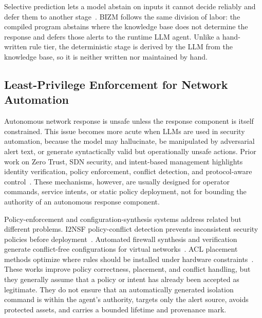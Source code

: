 \documentclass[final,5p]{elsarticle}
\begin{document}
Selective prediction lets a model abstain on inputs it cannot decide reliably and defer them to another stage~\cite{geifman2017selective}. BIZM follows the same division of labor: the compiled program abstains where the knowledge base does not determine the response and defers those alerts to the runtime LLM agent. Unlike a hand-written rule tier, the deterministic stage is derived by the LLM from the knowledge base, so it is neither written nor maintained by hand.

\subsection{Least-Privilege Enforcement for Network Automation}
\label{sec:rw_enforcement}

Autonomous network response is unsafe unless the response component is itself constrained. This issue becomes more acute when LLMs are used in security automation, because the model may hallucinate, be manipulated by adversarial alert text, or generate syntactically valid but operationally unsafe actions. Prior work on Zero Trust, SDN security, and intent-based management highlights identity verification, policy enforcement, conflict detection, and protocol-aware control~\cite{rose2020zerotrust,metzger2023intentsecurity}. These mechanisms, however, are usually designed for operator commands, service intents, or static policy deployment, not for bounding the authority of an autonomous response component.

Policy-enforcement and configuration-synthesis systems address related but different problems. I2NSF policy-conflict detection prevents inconsistent security policies before deployment~\cite{nguyen2023i2nsf}. Automated firewall synthesis and verification generate conflict-free configurations for virtual networks~\cite{bringhenti2022firewall}. ACL placement methods optimize where rules should be installed under hardware constraints~\cite{zahwa2025acl}. These works improve policy correctness, placement, and conflict handling, but they generally assume that a policy or intent has already been accepted as legitimate. They do not ensure that an automatically generated isolation command is within the agent's authority, targets only the alert source, avoids protected assets, and carries a bounded lifetime and provenance mark.
\end{document}
